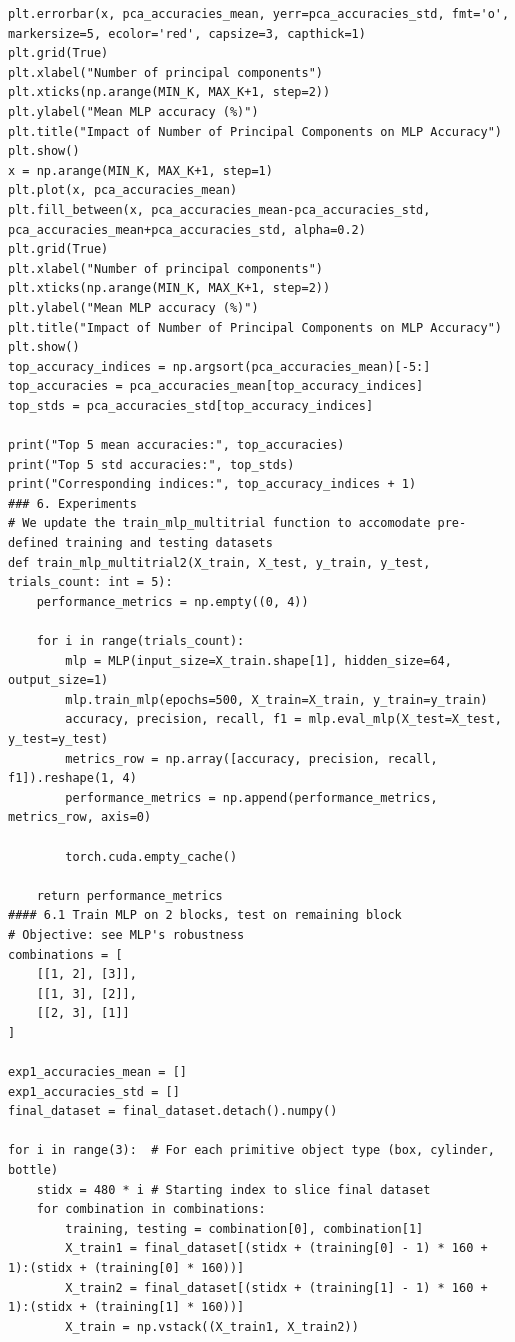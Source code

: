 \documentclass[11pt, a4paper]{report}
\begin{document}
\begin{lstlisting}
plt.errorbar(x, pca_accuracies_mean, yerr=pca_accuracies_std, fmt='o', markersize=5, ecolor='red', capsize=3, capthick=1)
plt.grid(True)
plt.xlabel("Number of principal components")
plt.xticks(np.arange(MIN_K, MAX_K+1, step=2))
plt.ylabel("Mean MLP accuracy (%)")
plt.title("Impact of Number of Principal Components on MLP Accuracy")
plt.show()
x = np.arange(MIN_K, MAX_K+1, step=1)
plt.plot(x, pca_accuracies_mean)
plt.fill_between(x, pca_accuracies_mean-pca_accuracies_std, pca_accuracies_mean+pca_accuracies_std, alpha=0.2)
plt.grid(True)
plt.xlabel("Number of principal components")
plt.xticks(np.arange(MIN_K, MAX_K+1, step=2))
plt.ylabel("Mean MLP accuracy (%)")
plt.title("Impact of Number of Principal Components on MLP Accuracy")
plt.show()
top_accuracy_indices = np.argsort(pca_accuracies_mean)[-5:] 
top_accuracies = pca_accuracies_mean[top_accuracy_indices]
top_stds = pca_accuracies_std[top_accuracy_indices]

print("Top 5 mean accuracies:", top_accuracies)
print("Top 5 std accuracies:", top_stds)
print("Corresponding indices:", top_accuracy_indices + 1)
### 6. Experiments
# We update the train_mlp_multitrial function to accomodate pre-defined training and testing datasets
def train_mlp_multitrial2(X_train, X_test, y_train, y_test, trials_count: int = 5):
    performance_metrics = np.empty((0, 4))

    for i in range(trials_count):
        mlp = MLP(input_size=X_train.shape[1], hidden_size=64, output_size=1)
        mlp.train_mlp(epochs=500, X_train=X_train, y_train=y_train)
        accuracy, precision, recall, f1 = mlp.eval_mlp(X_test=X_test, y_test=y_test)
        metrics_row = np.array([accuracy, precision, recall, f1]).reshape(1, 4)
        performance_metrics = np.append(performance_metrics, metrics_row, axis=0)

        torch.cuda.empty_cache()
    
    return performance_metrics
#### 6.1 Train MLP on 2 blocks, test on remaining block
# Objective: see MLP's robustness
combinations = [
    [[1, 2], [3]],
    [[1, 3], [2]],
    [[2, 3], [1]]
]

exp1_accuracies_mean = []
exp1_accuracies_std = []
final_dataset = final_dataset.detach().numpy()

for i in range(3):  # For each primitive object type (box, cylinder, bottle)
    stidx = 480 * i # Starting index to slice final dataset
    for combination in combinations:
        training, testing = combination[0], combination[1]
        X_train1 = final_dataset[(stidx + (training[0] - 1) * 160 + 1):(stidx + (training[0] * 160))]
        X_train2 = final_dataset[(stidx + (training[1] - 1) * 160 + 1):(stidx + (training[1] * 160))]
        X_train = np.vstack((X_train1, X_train2))


\end{lstlisting}
\end{document}
